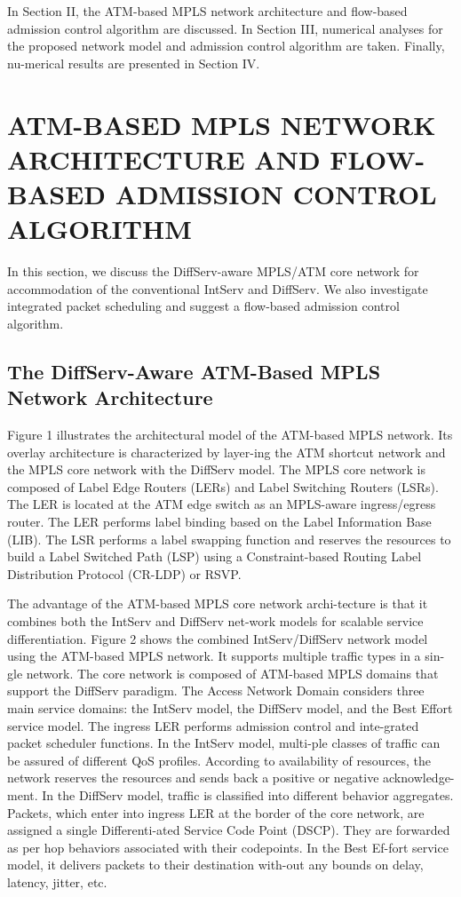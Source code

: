 \documentclass[10pt, twocolumn, twoside]{etri}
\begin{document}
In Section II, the ATM-based MPLS network architecture and flow-based
admission control algorithm are discussed. In Section III, numerical
analyses for the proposed network model and admission control algorithm
are taken. Finally, nu-merical results are presented in Section IV.

\section{ATM-BASED MPLS NETWORK ARCHITECTURE AND
	FLOW-BASED ADMISSION CONTROL ALGORITHM}

In this section, we discuss the DiffServ-aware MPLS/ATM core network
for accommodation of the conventional IntServ and DiffServ. We also
investigate integrated packet scheduling and suggest a flow-based
admission control algorithm.

\subsection{The DiffServ-Aware ATM-Based MPLS Network Architecture}

Figure 1 illustrates the architectural model of the ATM-based MPLS
network. Its overlay architecture is characterized by layer-ing the ATM
shortcut network and the MPLS core network with the DiffServ model. The
MPLS core network is composed of Label Edge Routers (LERs) and Label
Switching Routers (LSRs). The LER is located at the ATM edge switch as an
MPLS-aware ingress/egress router. The LER performs label binding based
on the Label Information Base (LIB). The LSR performs a label swapping
function and reserves the resources to build a Label Switched Path (LSP)
using a Constraint-based Routing Label Distribution Protocol (CR-LDP)
or RSVP.

The advantage of the ATM-based MPLS core network archi-tecture is that
it combines both the IntServ and DiffServ net-work models for scalable
service differentiation. Figure 2 shows the combined IntServ/DiffServ
network model using the ATM-based MPLS network. It supports multiple
traffic types in a sin-gle network. The core network is composed of
ATM-based MPLS domains that support the DiffServ paradigm. The Access
Network Domain considers three main service domains: the IntServ model,
the DiffServ model, and the Best Effort service model. The ingress LER
performs admission control and inte-grated packet scheduler functions. In
the IntServ model, multi-ple classes of traffic can be assured of
different QoS profiles. According to availability of resources, the
network reserves the resources and sends back a positive or negative
acknowledge-ment. In the DiffServ model, traffic is classified into
different behavior aggregates. Packets, which enter into ingress LER at
the border of the core network, are assigned a single Differenti-ated
Service Code Point (DSCP). They are forwarded as per hop behaviors
associated with their codepoints. In the Best Ef-fort service model,
it delivers packets to their destination with-out any bounds on delay,
latency, jitter, etc.
\end{document}
